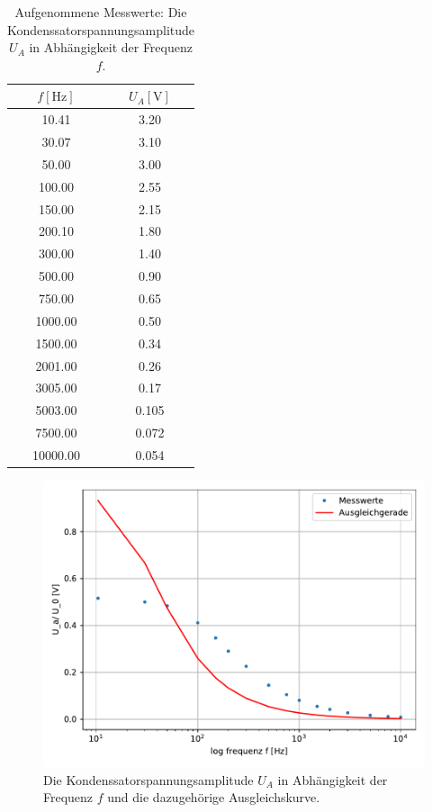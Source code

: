 \begin{table}
  \centering
  \caption{Aufgenommene Messwerte: Die Kondenssatorspannungsamplitude $U_A$ in Abhängigkeit der Frequenz $f$.}
  \label{tab:data_b}
  \begin{tabular}{c c}
    \toprule
    $f [\si{\hertz}]$ & $U_A [\si{\volt}]$ \\
    \midrule
    10.41       &   3.20    \\
    30.07       &   3.10    \\
    50.00       &   3.00    \\
    100.00      &   2.55    \\
    150.00      &   2.15    \\
    200.10      &   1.80    \\
    300.00      &   1.40    \\
    500.00      &   0.90    \\
    750.00      &   0.65    \\
    1000.00     &   0.50    \\
    1500.00     &   0.34    \\
    2001.00     &   0.26    \\
    3005.00     &   0.17    \\
    5003.00     &   0.105   \\
    7500.00     &   0.072   \\
    10000.00    &   0.054   \\
    \bottomrule
  \end{tabular}
\end{table}

\begin{figure}
  \centering
  \includegraphics{content/data_b_ausgleich.pdf}
  \caption{Die Kondenssatorspannungsamplitude $U_A$ in Abhängigkeit der Frequenz $f$ und die dazugehörige Ausgleichskurve.}
  \label{fig:data_b}
\end{figure}


